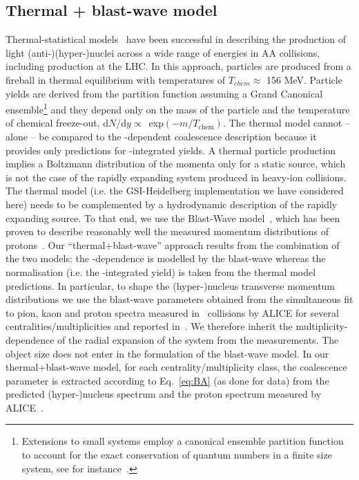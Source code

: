 \documentclass{appolb}
\begin{document}
\subsection{Thermal + blast-wave model} 
Thermal-statistical models~\cite{Andronic:2010qu, Andronic:2017} have been successful in describing the production of light \mbox{(anti-)}(hyper-)nuclei across a wide range of energies in AA collisions, including production at the LHC. 
In this approach, particles are produced from a fireball in thermal equilibrium with temperatures of $T_{chem} \approx$ 156 MeV. 
Particle yields are derived from the partition function assuming a Grand Canonical ensemble\footnote{Extensions to small systems employ a canonical ensemble partition function to account for the exact conservation of quantum numbers in a finite size system, see for instance~\cite{Vovchenko:2018fiy}.} and they depend only on the mass of the particle and the temperature of chemical freeze-out, d$N$/d$y\propto$~exp$(-m/T_{\mathrm{chem}})$.
The thermal model cannot -- alone -- be compared to the \pt-dependent coalescence description because it provides only predictions for \pt-integrated yields. 
A thermal particle production implies a Boltzmann distribution of the momenta only for a static source, which is not the case of the rapidly expanding system produced in heavy-ion collisions. 
The thermal model (i.e. the GSI-Heidelberg implementation we have considered here) needs to be complemented by a hydrodynamic description of the rapidly expanding source. 
To that end, we use the Blast-Wave model~\cite{Schnedermann:1993ws}, which has been proven to describe reasonably well the measured momentum distributions of protons~\cite{Abelev:2013vea}. 
Our ``thermal+blast-wave'' approach results from the combination of the two models: the \pt-dependence is modelled by the blast-wave whereas the normalisation (i.e. the \pt-integrated yield) is taken from the thermal model predictions.
In particular, to shape the (hyper-)nucleus transverse momentum distributions we use the blast-wave parameters obtained from the simultaneous fit to pion, kaon and proton spectra measured in \PbPb~collisions by ALICE for several centralities/multiplicities and reported in~\cite{Abelev:2013vea}. We therefore inherit the multiplicity-dependence of the radial expansion of the system from the measurements. The object size does not enter in the formulation of the blast-wave model. 
In our thermal+blast-wave model, for each centrality/multiplicity class, the coalescence parameter is extracted according to Eq.~\ref{eq:BA} (as done for data) from the predicted (hyper-)nucleus spectrum and the proton spectrum measured by ALICE~\cite{Abelev:2013vea}.
\end{document}
